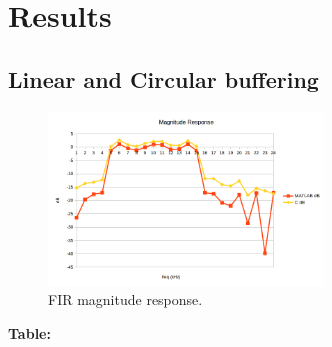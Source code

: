 \documentclass{article}
\begin{document}

\section{Results}

\subsection{Linear and Circular buffering}

\begin{figure}[h]
  \begin{center}
    \includegraphics[width=0.65\textwidth]{img/fir_mag.png}
    \caption{FIR magnitude response.}
  \end{center}
\end{figure}

\pagebreak
\textbf{Table:}
\end{document}
